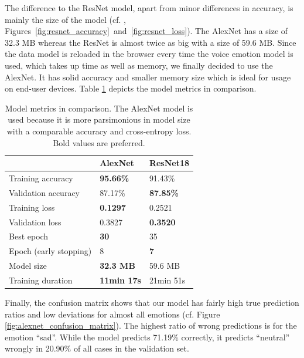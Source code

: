 The difference to the ResNet model, apart from minor differences in accuracy, is mainly the size of the model (cf. , Figures~\ref{fig:resnet_accuracy}~and~\ref{fig:resnet_loss}). The AlexNet has a size of 32.3 MB whereas the ResNet is almost twice as big with a size of 59.6 MB. Since the data model is reloaded in the browser every time the voice emotion model is used, which takes up time as well as memory, we finally decided to use the AlexNet. It has solid accuracy and smaller memory size which is ideal for usage on end-user devices. Table \ref{tab:model_comparison} depicts the model metrics in comparison.

\begin{table}
\setlength{\tabcolsep}{18pt}
\renewcommand{\arraystretch}{1.5}
\centering
\begin{tabular}{l|ll}
                       & AlexNet            & ResNet18         \\ \hline
Training accuracy      & \textbf{95.66\%}   & 91.43\%          \\
Validation accuracy    & 87.17\%            & \textbf{87.85\%} \\
Training loss          & \textbf{0.1297}    & 0.2521           \\
Validation loss        & 0.3827             & \textbf{0.3520}  \\
Best epoch             & \textbf{30}        & 35               \\
Epoch (early stopping) & 8                  & \textbf{7}       \\
Model size             & \textbf{32.3 MB}   & 59.6 MB          \\
Training duration      & \textbf{11min 17s} & 21min 51s        \\
\end{tabular}
\caption{Model metrics in comparison. The AlexNet model is used because it is more parsimonious in model size with a comparable accuracy and cross-entropy loss. Bold values are preferred.}
\label{tab:model_comparison}
\end{table}

Finally, the confusion matrix shows that our model has fairly high true prediction ratios and low deviations for almost all emotions (cf. Figure \ref{fig:alexnet_confusion_matrix}). The highest ratio of wrong predictions is for the emotion ``sad''. While the model predicts 71.19\% correctly, it predicts ``neutral'' wrongly in 20.90\% of all cases in the validation set.

